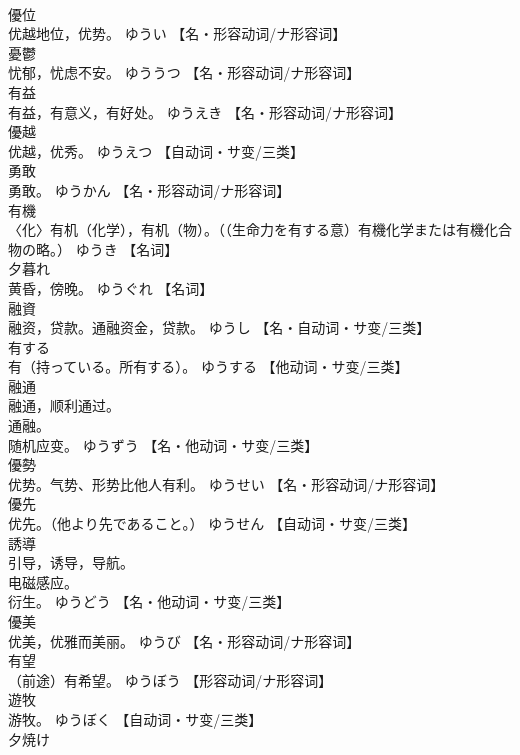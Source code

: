 \documentclass[8pt]{extreport}
\begin{document}
\begin{CJK}{UTF8}{min}
\\	優位	
\\	优越地位，优势。	ゆうい		【名・形容动词/ナ形容词】
\\	憂鬱	
\\	忧郁，忧虑不安。	ゆううつ		【名・形容动词/ナ形容词】
\\	有益	
\\	有益，有意义，有好处。	ゆうえき		【名・形容动词/ナ形容词】
\\	優越	
\\	优越，优秀。	ゆうえつ		【自动词・サ变/三类】
\\	勇敢	
\\	勇敢。	ゆうかん		【名・形容动词/ナ形容词】
\\	有機	
\\	〈化〉有机（化学），有机（物）。（（生命力を有する意）有機化学または有機化合物の略。）	ゆうき		【名词】
\\	夕暮れ	
\\	黄昏，傍晚。	ゆうぐれ		【名词】
\\	融資	
\\	融资，贷款。通融资金，贷款。	ゆうし		【名・自动词・サ变/三类】
\\	有する	
\\	有（持っている。所有する）。	ゆうする		【他动词・サ变/三类】
\\	融通	
\\	融通，顺利通过。 
\\	通融。 
\\	随机应变。	ゆうずう		【名・他动词・サ变/三类】
\\	優勢	
\\	优势。气势、形势比他人有利。	ゆうせい		【名・形容动词/ナ形容词】
\\	優先	
\\	优先。（他より先であること。）	ゆうせん		【自动词・サ变/三类】
\\	誘導	
\\	引导，诱导，导航。 
\\	电磁感应。 
\\	衍生。	ゆうどう		【名・他动词・サ变/三类】
\\	優美	
\\	优美，优雅而美丽。	ゆうび		【名・形容动词/ナ形容词】
\\	有望	
\\	（前途）有希望。	ゆうぼう		【形容动词/ナ形容词】
\\	遊牧	
\\	游牧。	ゆうぼく		【自动词・サ变/三类】
\\	夕焼け	

\end{CJK}
\end{document}

